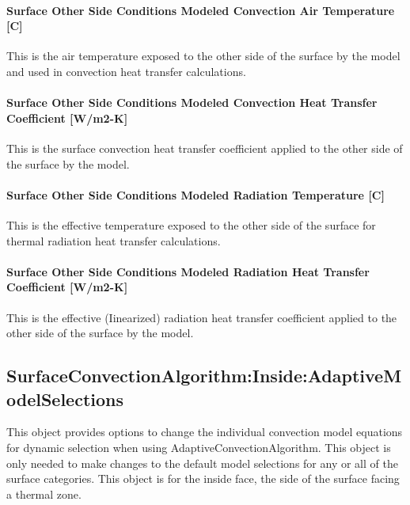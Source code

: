 \paragraph{Surface Other Side Conditions Modeled Convection Air Temperature {[}C{]}}\label{surface-other-side-conditions-modeled-convection-air-temperature-c}

This is the air temperature exposed to the other side of the surface by the model and used in convection heat transfer calculations.

\paragraph{Surface Other Side Conditions Modeled Convection Heat Transfer Coefficient {[}W/m2-K{]}}\label{surface-other-side-conditions-modeled-convection-heat-transfer-coefficient-wm2-k}

This is the surface convection heat transfer coefficient applied to the other side of the surface by the model.

\paragraph{Surface Other Side Conditions Modeled Radiation Temperature {[}C{]}}\label{surface-other-side-conditions-modeled-radiation-temperature-c}

This is the effective temperature exposed to the other side of the surface for thermal radiation heat transfer calculations.

\paragraph{Surface Other Side Conditions Modeled Radiation Heat Transfer Coefficient {[}W/m2-K{]}}\label{surface-other-side-conditions-modeled-radiation-heat-transfer-coefficient-wm2-k}

This is the effective (Iinearized) radiation heat transfer coefficient applied to the other side of the surface by the model.

\subsection{SurfaceConvectionAlgorithm:Inside:AdaptiveModelSelections}\label{surfaceconvectionalgorithminsideadaptivemodelselections}

This object provides options to change the individual convection model equations for dynamic selection when using AdaptiveConvectionAlgorithm. This object is only needed to make changes to the default model selections for any or all of the surface categories. This object is for the inside face, the side of the surface facing a thermal zone.

